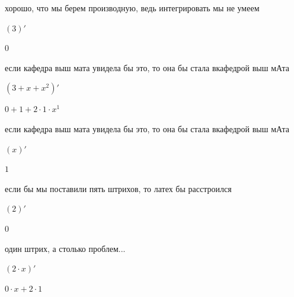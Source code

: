 \documentclass[a4paper,12pt]{article}
\begin{document}
хорошо, что мы берем производную, ведь интегрировать мы не умеем 

\begin{center}$(3)'$

\end{center}



\begin{center}$0$

\end{center}

если кафедра выш мата увидела бы это, то она бы стала вкафедрой выш мАта 

\begin{center}$(3+x+x^{2})'$

\end{center}



\begin{center}$0+1+2 \cdot 1 \cdot x^{1}$

\end{center}

если кафедра выш мата увидела бы это, то она бы стала вкафедрой выш мАта 

\begin{center}$(x)'$

\end{center}



\begin{center}$1$

\end{center}

если бы мы поставили пять штрихов, то латех бы расстроился 

\begin{center}$(2)'$

\end{center}



\begin{center}$0$

\end{center}

один штрих, а столько проблем... 

\begin{center}$(2 \cdot x)'$

\end{center}



\begin{center}$0 \cdot x+2 \cdot 1$

\end{center}
\end{document}
